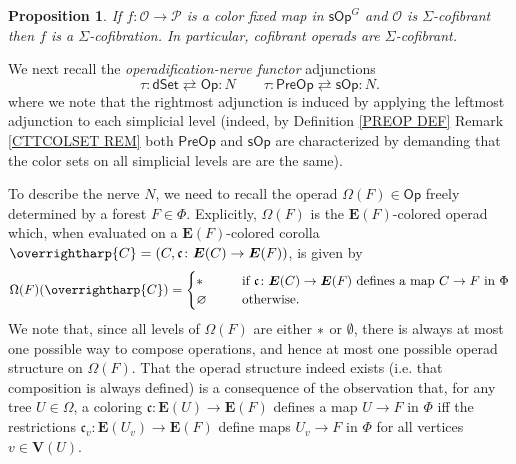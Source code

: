 \documentclass[a4paper,10pt
,draft
]{article}%
\numberwithin{equation}{section}
\numberwithin{figure}{section}
\newtheorem{proposition}[equation]{Proposition}%
\theoremstyle{definition} %
\newcommand{\vect}[1]{\text{\overrightharp{\ensuremath{#1}}}}
\renewcommand{\O}{\ensuremath{\mathcal O}}
\newcommand{\1}{\ensuremath{\mathbbm 1}}%
\begin{document}
\begin{proposition}\label{COPOFSIGCOF PROP}
	If $f \colon \O \to \mathcal{P}$
	is a color fixed map in $\mathsf{sOp}^G$
	and $\O$ is $\Sigma$-cofibrant
	then $f$ is a $\Sigma$-cofibration.
	In particular, cofibrant operads are $\Sigma$-cofibrant.
\end{proposition}




We next recall the 
\emph{operadification-nerve functor}
adjunctions
\begin{equation}\label{TAUNER EQ}
	\tau\colon \mathsf{dSet}
	\rightleftarrows
	\mathsf{Op} \colon N
\qquad
	\tau\colon \mathsf{PreOp}
	\rightleftarrows
	\mathsf{sOp} \colon N.
\end{equation}
where we note that the rightmost adjunction 
is induced by applying the leftmost adjunction
to each simplicial level
(indeed, by Definition \ref{PREOP DEF} 
Remark \ref{CTTCOLSET REM}
both $\mathsf{PreOp}$ and $\mathsf{sOp}$
are characterized by demanding that
the color sets on all simplicial levels are
are the same).

To describe the nerve $N$, 
we need to recall the operad
$\Omega(F) \in \mathsf{Op}$
freely determined by a forest $F \in \Phi$.
Explicitly, 
$\Omega(F)$ is the $\boldsymbol{E}(F)$-colored operad
which, when evaluated on
a $\boldsymbol{E}(F)$-colored corolla
$\vect{C} = 
(C,\mathfrak{c} \colon \boldsymbol{E}(C) \to \boldsymbol{E}(F))$,
is given by
\begin{equation}\label{OMEGADEF_EQ}
\Omega(F)(\vect C) =
	\begin{cases}
		\** \qquad & 
		\mbox{if
			$\mathfrak{c} \colon \boldsymbol{E}(C) \to \boldsymbol{E}(F)$
			defines a map $C \to F$ in $\Phi$}
	\\
		\varnothing & \text{otherwise.}
	\end{cases}
\end{equation}
We note that, since all levels of 
$\Omega(F)$ are either $\**$ or $\emptyset$,
there is always at most one possible way to compose operations,
and hence at most one possible operad structure on $\Omega(F)$.
That the operad structure indeed exists 
(i.e. that composition is always defined)
is a consequence of the observation that,
for any tree $U\in \Omega$,
a coloring
$\mathfrak{c} \colon \boldsymbol{E}(U) \to \boldsymbol{E}(F)$
defines a map
$U \to F$ in $\Phi$
iff
the restrictions
$\mathfrak{c}_v \colon \boldsymbol{E}(U_v) \to \boldsymbol{E}(F)$
define maps
$U_v \to F$ in $\Phi$
for all vertices $v \in \boldsymbol{V}(U)$.
\end{document}
